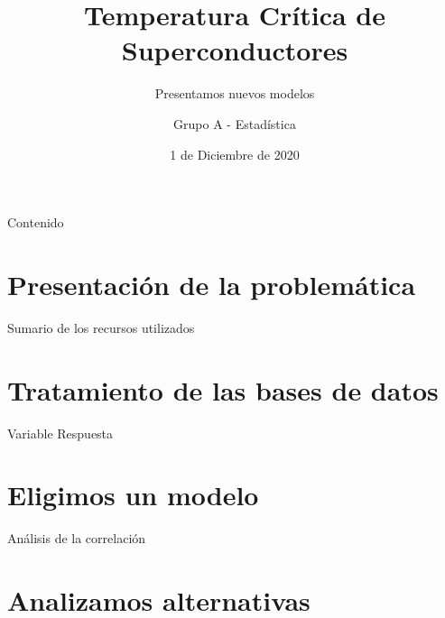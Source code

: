 \documentclass[11pt]{beamer}\usepackage{knitr}
\title{Temperatura Crítica de Superconductores} %
\subtitle{Presentamos nuevos modelos} %
\author{Grupo A - Estadística}		%
\date{1 de Diciembre de 2020}		%
\institute[PUC]{
	\inst{}
		Pontificia Universidad Católica de Chile \\
		Facultad de Matemáticas \\
		EYP2307 - Análisis de Regresión
        }
\begin{document}
\begin{frame}
	\maketitle
\end{frame}

\begin{frame}[fragile]{Contenido}
	\tableofcontents
\end{frame}



\section{Presentación de la problemática}

\begin{frame}[fragile]{Sumario de los recursos utilizados}

\end{frame}

\section{Tratamiento de las bases de datos}

\begin{frame}[fragile]{Variable Respuesta}

\end{frame}




\section{Eligimos un modelo}


\begin{frame}[fragile]{Análisis de la correlación}

\end{frame}


\section{Analizamos alternativas}
\end{document}
